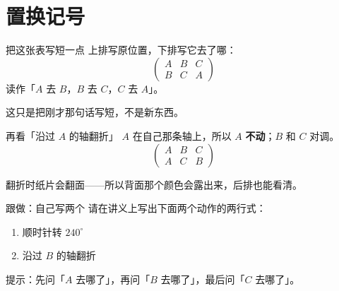 \documentclass[10pt]{beamer}
\begin{document}
\section{置换记号}

\begin{frame}{把这张表写短一点}
  上排写原位置，下排写它去了哪：
  \[
  \begin{pmatrix}
    A & B & C\\
    B & C & A
  \end{pmatrix}
  \]
  \pause
  读作「\(A\) 去 \(B\)，\(B\) 去 \(C\)，\(C\) 去 \(A\)」。
  \pause
  \begin{att}
    这只是把刚才那句话写短，不是新东西。
  \end{att}
\end{frame}

\begin{frame}{再看「沿过 \(A\) 的轴翻折」}
  \(A\) 在自己那条轴上，所以 \(A\) \textbf{不动}；\(B\) 和 \(C\) 对调。
  \pause
  \[
  \begin{pmatrix}
    A & B & C\\
    A & C & B
  \end{pmatrix}
  \]
  \pause
  \begin{center}
    翻折时纸片会翻面——所以背面那个颜色会露出来，后排也能看清。
  \end{center}
\end{frame}

\begin{frame}{跟做：自己写两个}
  请在讲义上写出下面两个动作的两行式：
  \begin{enumerate}
    \item 顺时针转 \(240^\circ\)
    \item 沿过 \(B\) 的轴翻折
  \end{enumerate}
  \pause
  \begin{center}
    提示：先问「\(A\) 去哪了」，再问「\(B\) 去哪了」，最后问「\(C\) 去哪了」。
  \end{center}
\end{frame}
\end{document}
